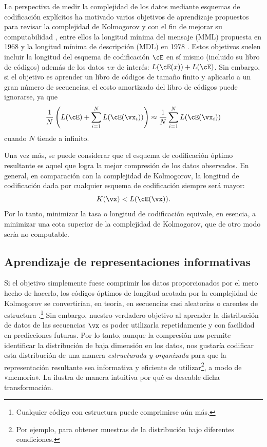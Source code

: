 \documentclass[../../book-main_es.tex]{subfiles}
\begin{document}
\begin{remark}\label{rem:computable-complexity}
    La perspectiva de medir la complejidad de los datos mediante
    esquemas de codificación explícitos ha motivado varios objetivos de aprendizaje
    propuestos para revisar la complejidad de Kolmogorov y con el fin de mejorar su computabilidad
    \cite{WallaceC1999}, entre ellos la longitud mínima del mensaje (MML)
    propuesta en 1968 \cite{WallaceC1968} y la longitud mínima de descripción
    (MDL) en 1978 \cite{Rissanen-1978,HansenM2001}.
    Estos objetivos suelen incluir la longitud del esquema de codificación
    \(\cE\) en sí mismo (incluido su libro de códigos) además de los datos
    \(vx\) de interés: \(L(\cE(x)) + L(\cE)\). Sin embargo, si el objetivo
    es aprender un libro de códigos de tamaño finito y aplicarlo a un gran
    número de secuencias, el costo amortizado del libro de códigos puede ignorarse, ya que
    \begin{equation}
        \frac{1}{N}\left( L(\cE) + \sum_{i=1}^{N}
        L(\cE(\vx_{i}))\right) \approx \frac{1}{N}\sum_{i=1}^{N} L(\cE(\vx_{i}))
    \end{equation}
    cuando \(N\) tiende a infinito.
\end{remark}

Una vez más, se puede considerar que el esquema de codificación óptimo resultante es aquel
que logra la mejor compresión de los datos observados. En general,
en comparación con la complejidad de Kolmogorov, la longitud de codificación dada por cualquier
esquema de codificación siempre será mayor:
\begin{equation}
    K(\vx) < L(\cE(\vx)).
\end{equation}
Por lo tanto, minimizar la tasa o longitud de codificación equivale, en esencia, a minimizar una
cota superior de la complejidad de Kolmogorov, que de otro modo sería no computable.

\subsection{Aprendizaje de representaciones informativas}
Si el objetivo simplemente fuese comprimir los datos proporcionados por el mero hecho de hacerlo,
los códigos óptimos de longitud acotada por la complejidad de Kolmogorov se convertirían, en teoría,
en secuencias casi aleatorias o carentes de estructura
\cite{Chaitin-1966}.\footnote{Cualquier código con estructura puede comprimirse aún más.}
Sin embargo, nuestro verdadero objetivo al aprender la distribución de datos
de las secuencias $\vx$ es poder utilizarla repetidamente y con facilidad en
predicciones futuras. Por lo tanto, aunque la compresión nos permite identificar
la distribución de baja dimensión en los datos, nos gustaría codificar
esta distribución de una manera \textit{estructurada y organizada} para que
la representación resultante sea informativa y eficiente de
utilizar\footnote{Por ejemplo, para obtener muestras de la distribución bajo diferentes
condiciones.}, a modo de «memoria». La  ilustra
de manera intuitiva por qué es deseable dicha transformación.
\end{document}
